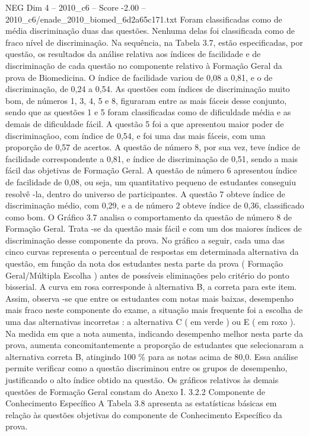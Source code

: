 \begin{textsample}{NEG Dim 4 – 2010\_c6 – Score -2.00 – 2010\_c6/enade\_2010\_biomed\_6d2a65c171.txt}
Foram classificadas como de média discriminação duas das questões.
Nenhuma delas foi classificada como de fraco nível de discriminação.
Na sequência, na Tabela 3.7, estão especificadas, por questão, os resultados da análise relativa aos índices de facilidade e de discriminação de cada questão no componente relativo à Formação Geral da prova de Biomedicina.
O índice de facilidade variou de 0,08 a 0,81, e o de discriminação, de 0,24 a 0,54.
As questões com índices de discriminação muito bom, de números 1, 3, 4, 5 e 8, figuraram entre as mais fáceis desse conjunto, sendo que as questões 1 e 5 foram classificadas como de dificuldade média e as demais de dificuldade fácil.
A questão 5 foi a que apresentou maior poder de discriminaçãoo, com índice de 0,54, e foi uma das mais fáceis, com uma proporção de 0,57 de acertos.
A questão de número 8, por sua vez, teve índice de facilidade correspondente a 0,81, e índice de discriminação de 0,51, sendo a mais fácil das objetivas de Formação Geral.
A questão de número 6 apresentou índice de facilidade de 0,08, ou seja, um quantitativo pequeno de estudantes conseguiu resolvê -la, dentro do universo de participantes.
A questão 7 obteve índice de discriminação médio, com 0,29, e a de número 2 obteve índice de 0,36, classificado como bom.
O Gráfico 3.7 analisa o comportamento da questão de número 8 de Formação Geral.
Trata -se da questão mais fácil e com um dos maiores índices de discriminação desse componente da prova.
No gráfico a seguir, cada uma das cinco curvas representa o percentual de respostas em determinada alternativa da questão, em função da nota dos estudantes nesta parte da prova ( Formação Geral/Múltipla Escolha ) antes de possíveis eliminações pelo critério do ponto bisserial.
A curva em rosa corresponde à alternativa B, a correta para este item.
Assim, observa -se que entre os estudantes com notas mais baixas, desempenho mais fraco neste componente do exame, a situação mais frequente foi a escolha de uma das alternativas incorretas : a alternativa C ( em verde ) ou E ( em roxo ).
Na medida em que a nota aumenta, indicando desempenho melhor nesta parte da prova, aumenta concomitantemente a proporção de estudantes que selecionaram a alternativa correta B, atingindo 100 \% para as notas acima de 80,0.
Essa análise permite verificar como a questão discriminou entre os grupos de desempenho, justificando o alto índice obtido na questão.
Os gráficos relativos às demais questões de Formação Geral constam do Anexo I. 3.2.2 Componente de Conhecimento Específico A Tabela 3.8 apresenta as estatísticas básicas em relação às questões objetivas do componente de Conhecimento Específico da prova.

\end{textsample}
